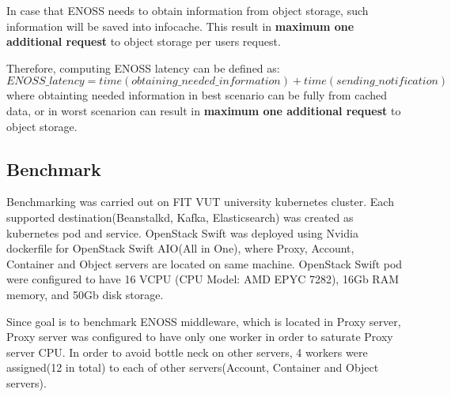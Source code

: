     In case that ENOSS needs to obtain information from object storage, such information will be saved into infocache. This result in \textbf{maximum one additional request} to object storage per users request.

    Therefore, computing ENOSS latency can be defined as:
    \texttt{\[ENOSS\_latency = time(obtaining\_needed\_information) + time(sending\_notification)\]}
    where obtainting needed information in best scenario can be fully from cached data, or in worst scenarion can result in \textbf{maximum one additional request} to object storage.

    \subsection{Benchmark}
    Benchmarking was carried out on FIT VUT university kubernetes cluster. Each supported destination(Beanstalkd, Kafka, Elasticsearch) was created as kubernetes pod and service. OpenStack Swift was deployed using Nvidia dockerfile for OpenStack Swift AIO(All in One), where Proxy, Account, Container and Object servers are located on same machine. OpenStack Swift pod were configured to have 16 VCPU (CPU Model: AMD EPYC 7282), 16Gb RAM memory, and 50Gb disk storage.

    Since goal is to benchmark ENOSS middleware, which is located in Proxy server, Proxy server was configured to have only one worker in order to saturate Proxy server CPU. In order to avoid bottle neck on other servers, 4 workers were assigned(12 in total) to each of other servers(Account, Container and Object servers).

